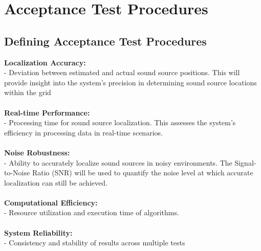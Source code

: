 \documentclass[a4paper,11pt]{article}
\newcommand{\mysection}[2]{\setcounter{section}{#1}\addtocounter{section}{-1}\section{#2}}
\begin{document}
\mysection{6}{Acceptance Test Procedures}

\subsection{Defining Acceptance Test Procedures}
\textbf{Localization Accuracy:}\\
- Deviation between estimated and actual sound source positions. This will provide insight into the system's precision in determining sound source locations within the grid \\\\
\textbf{Real-time Performance:}\\
- Processing time for sound source localization. This assesses the system's efficiency in processing data in real-time scenarios. \\\\
\textbf{Noise Robustness:}\\
- Ability to accurately localize sound sources in noisy environments. The Signal-to-Noise Ratio (SNR) will be used to quantify the noise level at which accurate localization can still be achieved. \\\\
\textbf{Computational Efficiency:}\\
- Resource utilization and execution time of algorithms. \\\\
\textbf{System Reliability:}\\
- Consistency and stability of results across multiple tests\\\\
\end{document}
